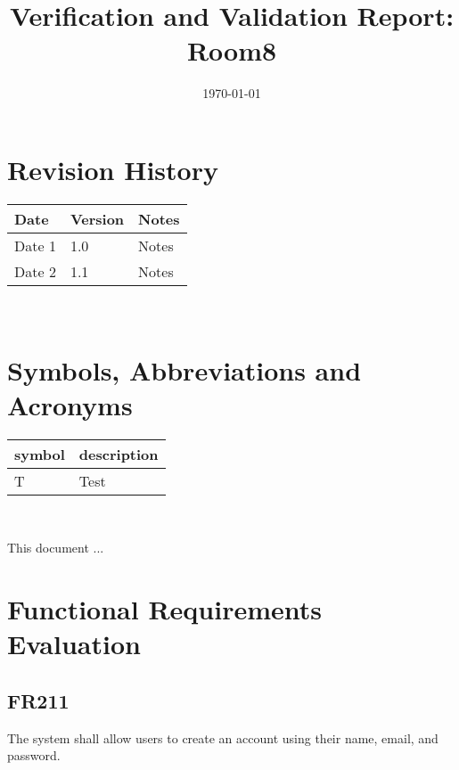 \documentclass[12pt, titlepage]{article}
\begin{document}
\title{Verification and Validation Report: Room8} 
\author{\authname}
\date{\today}
	
\maketitle


\section{Revision History}

\begin{tabularx}{\textwidth}{p{3cm}p{2cm}X}
\toprule {\bf Date} & {\bf Version} & {\bf Notes}\\
\midrule
Date 1 & 1.0 & Notes\\
Date 2 & 1.1 & Notes\\
\bottomrule
\end{tabularx}

~\newpage

\section{Symbols, Abbreviations and Acronyms}

\renewcommand{\arraystretch}{1.2}
\begin{tabular}{l l} 
  \toprule		
  \textbf{symbol} & \textbf{description}\\
  \midrule 
  T & Test\\
  \bottomrule
\end{tabular}\\


\newpage

\tableofcontents

\listoftables %

\listoffigures %

\newpage


This document ...

\section{Functional Requirements Evaluation}

\subsection{FR211}
The system shall allow users to create an account using their name, email, and password.
\end{document}
